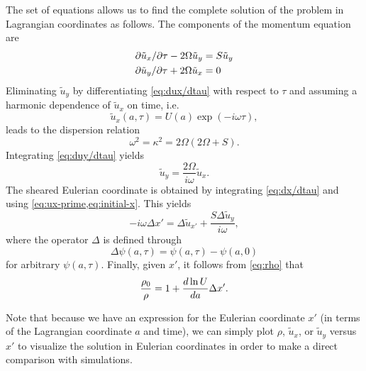 \documentclass[aps,pre,notitlepage,amsmath,amssymb,amsfonts,nobibnotes,nofootinbib,superscriptaddress,onecolumn,a4paper,10pt]{revtex4-1}
\begin{document}
The set of equations
allows us to find the complete solution of the problem in Lagrangian
coordinates as follows. The components of the momentum equation
 are
\begin{align}
  \label{eq:dux/dtau}
  \partial{\tilde{u}_x}/\partial{\tau} - 2\Omega\tilde{u}_y &= S\tilde{u}_y \\
  \label{eq:duy/dtau}
  \partial{\tilde{u}_y}/\partial{\tau} + 2\Omega\tilde{u}_x &= 0
\end{align}
Eliminating $\tilde{u}_y$ by differentiating \cref{eq:dux/dtau} with respect
to $\tau$ and assuming a harmonic dependence of $\tilde{u}_x$ on time, i.e.
\begin{equation}
  \tilde{u}_x(a,\tau) = U(a)\exp(-i\omega\tau),
\end{equation}
leads to the dispersion relation
\begin{equation}
  \omega^2 = \kappa^2 = 2\Omega(2\Omega + S).
\end{equation}
Integrating \cref{eq:duy/dtau} yields
\begin{equation}
  \tilde{u}_y = \frac{2\Omega}{i\omega}\tilde{u}_x.
\end{equation}
The sheared Eulerian coordinate is obtained by integrating \cref{eq:dx/dtau}
and using \cref{eq:ux-prime,eq:initial-x}. This yields
\begin{equation}
  -i\omega\Delta x' = \Delta\tilde{u}_{x'}
  + \frac{S\Delta\tilde{u}_y}{i\omega},
\end{equation}
where the operator $\Delta$ is defined through
\begin{equation}
  \Delta\psi(a,\tau) = \psi(a,\tau) - \psi(a,0)
\end{equation}
for arbitrary $\psi(a,\tau)$.
Finally, given $x'$, it follows from \cref{eq:rho} that
\begin{equation}
  \frac{\rho_0}{\rho} = 1 + \frac{d\ln U}{da}\Delta x'.
\end{equation}

Note that because we have an expression for the Eulerian coordinate $x'$ (in
terms of the Lagrangian coordinate $a$ and time), we can simply plot $\rho$,
$\tilde{u}_x$, or $\tilde{u}_y$ versus $x'$ to visualize the solution in
Eulerian coordinates in order to make a direct comparison with simulations.
\end{document}
